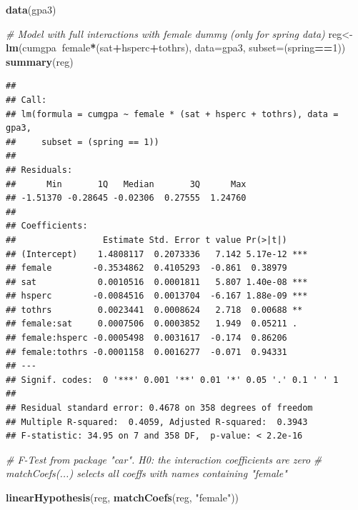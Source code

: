 \documentclass[]{book}
\newenvironment{Shaded}{\begin{snugshade}}{\end{snugshade}}
\newcommand{\CommentTok}[1]{\textcolor[rgb]{0.56,0.35,0.01}{\textit{#1}}}
\newcommand{\DataTypeTok}[1]{\textcolor[rgb]{0.13,0.29,0.53}{#1}}
\newcommand{\DecValTok}[1]{\textcolor[rgb]{0.00,0.00,0.81}{#1}}
\newcommand{\KeywordTok}[1]{\textcolor[rgb]{0.13,0.29,0.53}{\textbf{#1}}}
\newcommand{\NormalTok}[1]{#1}
\newcommand{\OperatorTok}[1]{\textcolor[rgb]{0.81,0.36,0.00}{\textbf{#1}}}
\newcommand{\StringTok}[1]{\textcolor[rgb]{0.31,0.60,0.02}{#1}}
\begin{document}
\begin{Shaded}
\begin{Highlighting}[]
\KeywordTok{data}\NormalTok{(gpa3)}

\CommentTok{# Model with full interactions with female dummy (only for spring data)}
\NormalTok{reg<-}\KeywordTok{lm}\NormalTok{(cumgpa}\OperatorTok{~}\NormalTok{female}\OperatorTok{*}\NormalTok{(sat}\OperatorTok{+}\NormalTok{hsperc}\OperatorTok{+}\NormalTok{tothrs), }\DataTypeTok{data=}\NormalTok{gpa3, }\DataTypeTok{subset=}\NormalTok{(spring}\OperatorTok{==}\DecValTok{1}\NormalTok{))}
\KeywordTok{summary}\NormalTok{(reg)}
\end{Highlighting}
\end{Shaded}

\begin{verbatim}
## 
## Call:
## lm(formula = cumgpa ~ female * (sat + hsperc + tothrs), data = gpa3, 
##     subset = (spring == 1))
## 
## Residuals:
##      Min       1Q   Median       3Q      Max 
## -1.51370 -0.28645 -0.02306  0.27555  1.24760 
## 
## Coefficients:
##                 Estimate Std. Error t value Pr(>|t|)    
## (Intercept)    1.4808117  0.2073336   7.142 5.17e-12 ***
## female        -0.3534862  0.4105293  -0.861  0.38979    
## sat            0.0010516  0.0001811   5.807 1.40e-08 ***
## hsperc        -0.0084516  0.0013704  -6.167 1.88e-09 ***
## tothrs         0.0023441  0.0008624   2.718  0.00688 ** 
## female:sat     0.0007506  0.0003852   1.949  0.05211 .  
## female:hsperc -0.0005498  0.0031617  -0.174  0.86206    
## female:tothrs -0.0001158  0.0016277  -0.071  0.94331    
## ---
## Signif. codes:  0 '***' 0.001 '**' 0.01 '*' 0.05 '.' 0.1 ' ' 1
## 
## Residual standard error: 0.4678 on 358 degrees of freedom
## Multiple R-squared:  0.4059, Adjusted R-squared:  0.3943 
## F-statistic: 34.95 on 7 and 358 DF,  p-value: < 2.2e-16
\end{verbatim}

\begin{Shaded}
\begin{Highlighting}[]
\CommentTok{# F-Test from package "car". H0: the interaction coefficients are zero}
\CommentTok{# matchCoefs(...) selects all coeffs with names containing "female"}

\KeywordTok{linearHypothesis}\NormalTok{(reg, }\KeywordTok{matchCoefs}\NormalTok{(reg, }\StringTok{"female"}\NormalTok{))}
\end{Highlighting}
\end{Shaded}

 
  \providecommand{\huxb}[2]{\arrayrulecolor[RGB]{#1}\global\arrayrulewidth=#2pt}
  \providecommand{\huxvb}[2]{\color[RGB]{#1}\vrule width #2pt}
  \providecommand{\huxtpad}[1]{\rule{0pt}{\baselineskip+#1}}
  \providecommand{\huxbpad}[1]{\rule[-#1]{0pt}{#1}}
\end{document}
